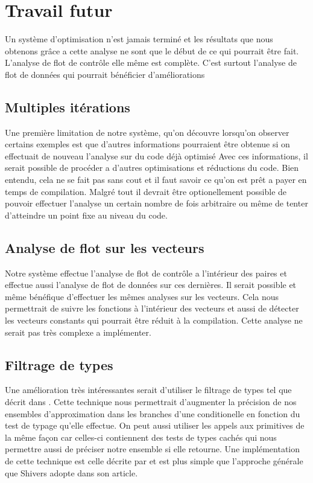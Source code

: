 \clearpage

\section{Travail futur}

Un système d'optimisation n'est jamais terminé et les résultats que
nous obtenons grâce a cette analyse ne sont que le début de ce qui
pourrait être fait. L'analyse de flot de contrôle elle même est
complète.  C'est surtout l'analyse de flot de données qui pourrait
bénéficier d'améliorations

\subsection{Multiples itérations}

Une première limitation de notre système, qu'on découvre lorsqu'on
observer certains exemples est que d'autres informations pourraient être
obtenue si on effectuait de nouveau l'analyse sur du code déjà optimisé
Avec ces informations, il serait possible de procéder a d'autres optimisations
et réductions du code. Bien entendu, cela ne se fait pas sans cout et il
faut savoir ce qu'on est prêt a payer en temps de compilation. Malgré tout
il devrait être optionellement possible de pouvoir effectuer l'analyse
un certain nombre de fois arbitraire ou même de tenter d'atteindre un point
fixe au niveau du code.

\subsection{Analyse de flot sur les vecteurs}

Notre système effectue l'analyse de flot de contrôle a l'intérieur des paires
et effectue aussi l'analyse de flot de données sur ces dernières. Il serait
possible et même bénéfique d'effectuer les mêmes analyses sur les vecteurs.
Cela nous permettrait de suivre les fonctions à l'intérieur des vecteurs
et aussi de détecter les vecteurs constants qui pourrait être réduit à
la compilation. Cette analyse ne serait pas très complexe a implémenter.

\subsection{Filtrage de types}

Une amélioration très intéressantes serait d'utiliser le
filtrage de types tel que décrit dans \cite{shivers88}.  Cette
technique nous permettrait d'augmenter la précision de nos ensembles
d'approximation dans les branches d'une conditionelle en fonction du
test de typage qu'elle effectue. On peut aussi utiliser les appels aux
primitives de la même façon car celles-ci contiennent des tests de
types cachés qui nous permettre aussi de préciser notre ensemble si
elle retourne. Une implémentation de cette technique est celle décrite
par \cite{boucher2000} et est plus simple que l'approche générale que
Shivers adopte dans son article.

